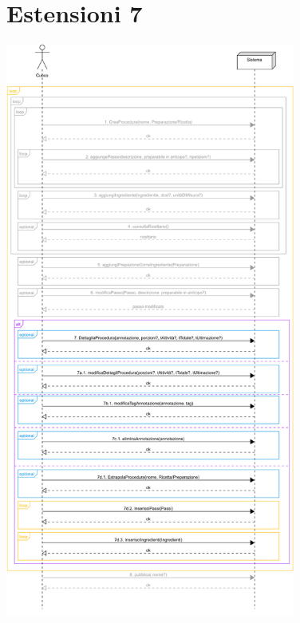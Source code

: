 \section*{Estensioni 7}
\begin{center}
  \includegraphics[max width=\textwidth, max height=190mm]{../resources/img/GRP/SSD/ext7.png}
\end{center}

